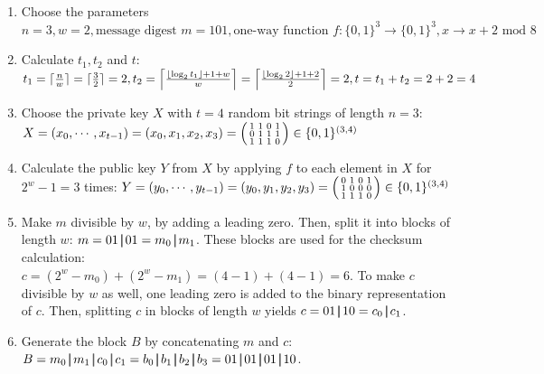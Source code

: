 \begin{enumerate}

\item Choose the parameters $n=3, w=2, \text{message digest } m = 101, {\text{one-way function } f:\{0,1\}^{3} \rightarrow \{0,1\}^{3}, x \rightarrow x+2 \text{ mod } 8}$

\item Calculate $t_1, t_2$ and $t$: \\
$t_1 = \ceil{\frac{n}{w}} = \ceil{\frac{3}{2}} = 2, t_2 = \ceil*{\frac{\floor*{\log_2 t_1} + 1 + w}{w} } = \ceil*{\frac{\floor*{\log_2 2} + 1 + 2}{2} } = 2, {t = t_1 + t_2 = 2+2 = 4}$

\item Choose the private key $X$ with $t=4$ random bit strings of length $n=3$: \\
$X = (x_0, \cdots, x_{t-1}) = (x_0, x_1, x_2, x_3) = 
\begin{psmallmatrix}
1 & 1 & 0 & 1\\
0 & 1 & 1 & 1\\
1 & 1 & 1 & 0
\end{psmallmatrix} \in \{0,1\}^{(3,4)} $

\item Calculate the public key $Y$ from $X$ by applying $f$ to each element in $X$ for $2^w-1 = 3$ times:	
$Y = (y_0, \cdots, y_{t-1}) = (y_0, y_1, y_2, y_3) = 
\begin{psmallmatrix}
0 & 1 & 0 & 1 \\
1 & 0 & 0 & 0 \\
1 & 1 & 1 & 0
\end{psmallmatrix} \in \{0,1\}^{(3,4)} $ 

\item Make $m$ divisible by $w$, by adding a leading zero. Then, split it into blocks of length $w$: $m = 01 \concat 01 = m_0 \concat m_1$. These blocks are used for the checksum calculation: \\ $c = (2^w - m_0) + (2^w - m_1) = (4-1)+(4-1)=6$. To make $c$ divisible by $w$ as well, one leading zero is added to the binary representation of $c$. Then, splitting $c$ in blocks of length $w$ yields $c = 01 \concat 10 = c_0 \concat c_1$.

\item Generate the block $B$ by concatenating $m$ and $c$: \\ $B = m_0 \concat m_1 \concat c_0 \concat c_1 = b_0 \concat b_1 \concat b_2 \concat b_3 = 01 \concat 01 \concat 01 \concat 10 $.


\end{enumerate}
